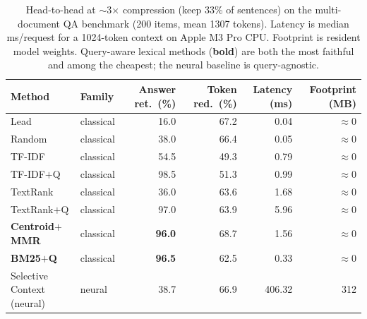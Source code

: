 \begin{table}[t]
\centering
\caption{Head-to-head at $\sim$3$\times$ compression (keep 33\% of sentences) on the
multi-document QA benchmark (200 items, mean 1307 tokens). Latency is median
ms/request for a 1024-token context on Apple M3 Pro CPU. Footprint is resident model
weights. Query-aware lexical methods (\textbf{bold}) are both the most faithful and
among the cheapest; the neural baseline is query-agnostic.}
\label{tab:main}
\small
\begin{tabular}{llrrrr}
\toprule
Method & Family & Answer ret.\ (\%) & Token red.\ (\%) & Latency (ms) & Footprint (MB) \\
\midrule
Lead & classical & 16.0 & 67.2 & 0.04 & $\approx$0 \\
Random & classical & 38.0 & 66.4 & 0.05 & $\approx$0 \\
TF-IDF & classical & 54.5 & 49.3 & 0.79 & $\approx$0 \\
TF-IDF$+$Q & classical & 98.5 & 51.3 & 0.99 & $\approx$0 \\
TextRank & classical & 36.0 & 63.6 & 1.68 & $\approx$0 \\
TextRank$+$Q & classical & 97.0 & 63.9 & 5.96 & $\approx$0 \\
\textbf{Centroid$+$MMR} & classical & \textbf{96.0} & 68.7 & 1.56 & $\approx$0 \\
\textbf{BM25$+$Q} & classical & \textbf{96.5} & 62.5 & 0.33 & $\approx$0 \\
Selective Context (neural) & neural & 38.7 & 66.9 & 406.32 & 312 \\
\bottomrule
\end{tabular}
\end{table}
